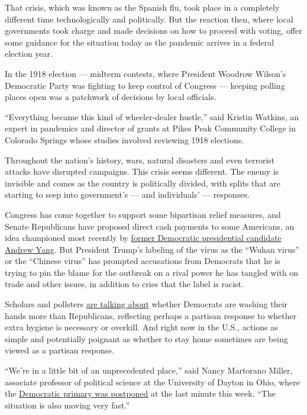 That crisis, which was known as the Spanish flu, took place in a
completely different time technologically and politically. But the
reaction then, where local governments took charge and made decisions on
how to proceed with voting, offer some guidance for the situation today
as the pandemic arrives in a federal election year.

In the 1918 election --- midterm contests, where President Woodrow
Wilson's Democratic Party was fighting to keep control of Congress ---
keeping polling places open was a patchwork of decisions by local
officials.

``Everything became this kind of wheeler-dealer hustle,'' said Kristin
Watkins, an expert in pandemics and director of grants at Pikes Peak
Community College in Colorado Springs whose studies involved reviewing
1918 elections.

Throughout the nation's history, wars, natural disasters and even
terrorist attacks have disrupted campaigns. This crisis seems different.
The enemy is invisible and comes as the country is politically divided,
with splits that are starting to seep into government's --- and
individuals' --- responses.

Congress has come together to support some bipartisan relief measures,
and Senate Republicans have proposed direct cash payments to some
Americans, an idea championed most recently by
\href{https://www.nytimes3xbfgragh.onion/2020/03/18/us/politics/universal-basic-income-andrew-yang.html}{former
Democratic presidential candidate Andrew Yang}. But President Trump's
labeling of the virus as the ``Wuhan virus'' or the ``Chinese virus''
has prompted accusations from Democrats that he is trying to pin the
blame for the outbreak on a rival power he has tangled with on trade and
other issues, in addition to cries that the label is racist.

Scholars and pollsters
\href{https://iai.tv/articles/republicans-assert-party-loyalty-by-ignoring-medical-advice-on-covid-19-auid-1380}{are
talking about} whether Democrats are washing their hands more than
Republicans, reflecting perhaps a partisan response to whether extra
hygiene is necessary or overkill. And right now in the U.S., actions as
simple and potentially poignant as whether to stay home sometimes are
being viewed as a partisan response.

``We're in a little bit of an unprecedented place,'' said Nancy
Martorano Miller, associate professor of political science at the
University of Dayton in Ohio, where the
\href{https://www.nytimes3xbfgragh.onion/2020/03/16/us/politics/virus-primary-2020-ohio.html}{Democratic
primary was postponed} at the last minute this week. ``The situation is
also moving very fast.''

